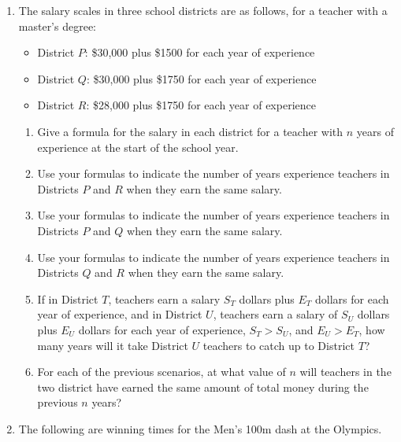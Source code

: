 \documentclass[
]{book}
\providecommand{\tightlist}{%
  \setlength{\itemsep}{0pt}\setlength{\parskip}{0pt}}
\theoremstyle{definition}
\theoremstyle{definition}
\theoremstyle{definition}
\theoremstyle{definition}
\theoremstyle{remark}
\begin{document}
\begin{enumerate}
\def\labelenumi{\arabic{enumi}.}
\item
  The salary scales in three school districts are as follows, for a teacher with a master's degree:

  \begin{itemize}
  \tightlist
  \item
    District \(P\): \$30,000 plus \$1500 for each year of experience
  \item
    District \(Q\): \$30,000 plus \$1750 for each year of experience
  \item
    District \(R\): \$28,000 plus \$1750 for each year of experience
  \end{itemize}

  \begin{enumerate}
  \def\labelenumii{\alph{enumii}.}
  \tightlist
  \item
    Give a formula for the salary in each district for a teacher with \(n\) years of experience at the start of the school year.
  \item
    Use your formulas to indicate the number of years experience teachers in Districts \(P\) and \(R\) when they earn the same salary.
  \item
    Use your formulas to indicate the number of years experience teachers in Districts \(P\) and \(Q\) when they earn the same salary.
  \item
    Use your formulas to indicate the number of years experience teachers in Districts \(Q\) and \(R\) when they earn the same salary.
  \item
    If in District \(T\), teachers earn a salary \(S_T\) dollars plus \(E_T\) dollars for each year of experience, and in District \(U\), teachers earn a salary of \(S_U\) dollars plus \(E_U\) dollars for each year of experience, \(S_T>S_U\), and \(E_U>E_T\), how many years will it take District \(U\) teachers to catch up to District \(T\)?
  \item
    For each of the previous scenarios, at what value of \(n\) will teachers in the two district have earned the same amount of total money during the previous \(n\) years?
  \end{enumerate}
\item
  The following are winning times for the Men's 100m dash at the Olympics.

  \begin{table}


\end{table}
\end{enumerate}
\end{document}
